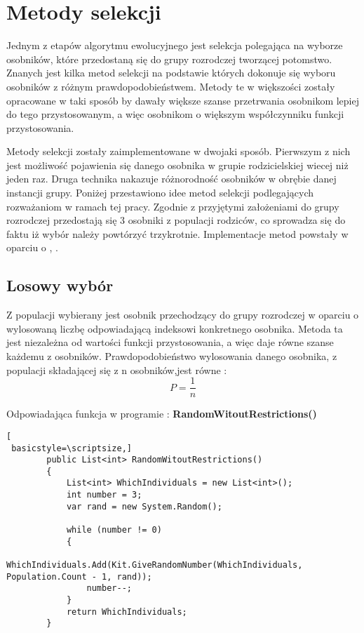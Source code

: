 \chapter{Metody selekcji}\label{metody_selekcji}

Jednym z etapów algorytmu ewolucyjnego jest selekcja polegająca na wyborze osobników, które przedostaną się do grupy rozrodczej tworzącej potomstwo. Znanych jest kilka metod selekcji na podstawie których dokonuje się wyboru osobników z różnym prawdopodobieństwem. Metody te w większości zostały opracowane w taki sposób by dawały większe szanse przetrwania osobnikom lepiej do tego przystosowanym, a więc osobnikom o większym współczynniku funkcji przystosowania. 

Metody selekcji zostały zaimplementowane w dwojaki sposób. Pierwszym z nich jest możliwość pojawienia się danego osobnika w grupie rodzicielskiej wiecej niż jeden raz. Druga technika nakazuje różnorodność osobników w obrębie danej instancji grupy. Poniżej przestawiono idee metod selekcji podlegających rozważaniom w ramach tej pracy. Zgodnie z przyjętymi założeniami do grupy rozrodczej przedostają się 3 osobniki z populacji rodziców, co sprowadza się do faktu iż wybór należy powtórzyć trzykrotnie. Implementacje metod powstały w oparciu o \cite{maszynowe_sel}, \cite{gracjan}.


\section{Losowy wybór}\label{sec:strukturaDokumentu}

Z populacji wybierany jest osobnik przechodzący do grupy rozrodczej w oparciu o  wylosowaną liczbę odpowiadającą indeksowi konkretnego osobnika. Metoda ta jest niezależna od wartości funkcji przystosowania, a więc daje równe szanse każdemu z osobników. Prawdopodobieństwo wylosowania danego osobnika, z populacji składającej się z n osobników,jest równe :
\vspace{0,4cm}
$$
P = \frac{1}{n}
$$

\par
Odpowiadająca funkcja w programie :\textbf{ RandomWitoutRestrictions()}

\begin{program}
\begin{lstlisting}[
 basicstyle=\scriptsize,]
        public List<int> RandomWitoutRestrictions()
        {
            List<int> WhichIndividuals = new List<int>();
            int number = 3;
            var rand = new System.Random();

            while (number != 0)
            {
                WhichIndividuals.Add(Kit.GiveRandomNumber(WhichIndividuals, Population.Count - 1, rand));
                number--;
            }
            return WhichIndividuals;
        }
\end{lstlisting}
\end{program}

